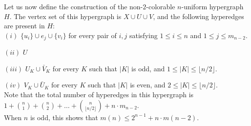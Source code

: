 \documentclass[11pt]{article}
\begin{document}
Let us now define the construction of the non-$2$-colorable $n$-uniform hypergraph $H$. The vertex set of this hypergraph is $X \cup U \cup V$, and the following hyperedges are present in $H$:\\

$(i)$ $\{u_i\} \cup e_j \cup \{v_i\}$ for every pair of $i, j$ satisfying $1 \leq i \leq n$ 
and $1 \leq j \leq m_{n-2}$. 

$(ii)$ $U$

$(iii)$ $U_K \cup {\bar{V}}_K$ for every $K$ such that $|K|$ is odd, and $1 \leq |K| \leq \lfloor n/2 \rfloor$.

$(iv)$ $V_K \cup {\bar{U}}_K$ for every $K$ such that $|K|$ is even, and $2 \leq |K| \leq \lfloor n/2 \rfloor$. \\

\noindent Note that the total number of hyperedges in this hypergraph is \\

$1 + \binom{n}{1} + \binom{n}{2} + \ldots + \binom{n}{\lfloor n/2 \rfloor} + n \cdot m_{n-2}$.
\\

\noindent When $n$ is odd, this shows that $m(n) \leq 2^{n-1} + n \cdot m(n-2)$.
\end{document}
